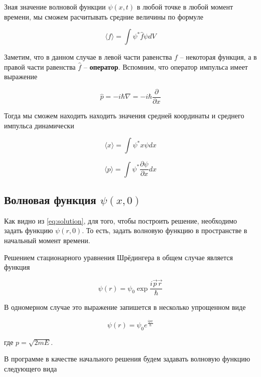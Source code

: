 \documentclass[a4paper, 12pt]{article}
\begin{document}
    Зная значение волновой функции $\psi(x, t)$ в любой точке в любой момент времени, мы сможем расчитывать средние величины
    по формуле 

    \begin{equation}
        \langle f \rangle = \int \psi^* \hat{f} \psi dV
    \end{equation}

    Заметим, что в данном случае в левой части равенства $f$ -- некоторая функция, а в правой части равенства $\hat{f}$ -- 
    \textbf{оператор}. Вспомним, что оператор импульса имеет выражение

    \begin{equation}
        \hat{p} = -i \hbar \nabla = -i \hbar \frac{\partial}{\partial x}
    \end{equation}

    Тогда мы сможем находить находить значения средней координаты и среднего импульса динамически

    \begin{equation}
        \langle x \rangle = \int \psi^* x \psi dx
    \end{equation}

    \begin{equation}
        \langle p \rangle = \int \psi^* \frac{\partial \psi}{\partial x} dx
    \end{equation}

    \subsection{Волновая функция $\psi(x, 0)$}

    Как видно из \eqref{eq:solution}, для того, чтобы построить решение, необходимо задать функцию $\psi(r, 0)$. То есть,
    задать волновую функцию в пространстве в начальный момент времени. 

    Решением стационарного уравнения Шрёдингера в общем случае является функция

    \begin{equation}
        \psi(r) = \psi_0 \exp{\frac{i \vec{p} \vec{r}}{\hbar}}
    \end{equation}

    В одномерном случае это выражение запишется в несколько упрощенном виде

    \[ \psi(r) = \psi_0 e^{\frac{i p x}{\hbar}} \]

    где $p = \sqrt{2mE}$.

    В программе в качестве начального решения будем задавать волновую функцию следующего вида
\end{document}
